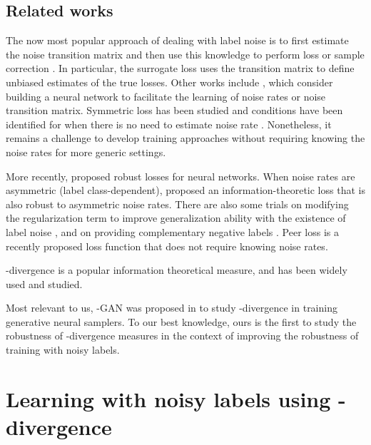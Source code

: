 \documentclass{article}
\begin{document}
\subsection{Related works}

The now most popular approach of dealing with label noise is to first estimate the noise transition matrix and then use this knowledge to perform loss or sample correction  \citep{scott2013classification,natarajan2013learning,patrini2017making,lu2018minimal,han2018co,tanaka2018joint,yao2020dual,zhu2021clusterability}. In particular, the surrogate loss \citep{scott2013classification,natarajan2013learning,scott2015rate,van2015learning,menon2015learning}  uses the transition matrix to define unbiased estimates of the true losses. 
Other works include \citep{sukhbaatar2014learning,xiao2015learning}, which consider building a neural network to facilitate the learning of noise rates or noise transition matrix. Symmetric loss has been studied and conditions have been identified for when there is no need to estimate noise rate \citep{manwani2013noise,ghosh2015making,ghosh2017robust,van2015learning,charoenphakdee2019symmetric}. Nonetheless, it remains a challenge to develop training approaches without requiring knowing the noise rates for more generic settings.

More recently, \citep{zhang2018generalized,amid2019robust} proposed robust losses for neural networks. 
When noise rates are asymmetric (label class-dependent), \citep{xu2019l_dmi} proposed an information-theoretic loss that is also robust to asymmetric noise rates. There are also some trials on modifying the regularization term to improve generalization ability with the existence of label noise \citep{jenni2018deep,Yi_2019_CVPR}, and on providing complementary negative labels \citep{kim2019nlnl}.
Peer loss \citep{liu2019peer} is a recently proposed loss function that does not require knowing noise rates. 

-divergence is a popular information theoretical measure, and has been widely used and studied.

Most relevant to us, -GAN was proposed in \citep{nowozin2016f} to study -divergence in training generative neural samplers.
To our best knowledge, ours is the first to study the robustness of -divergence measures in the context of improving the robustness of training with noisy labels.  \section{Learning with noisy labels using -divergence}
\end{document}
